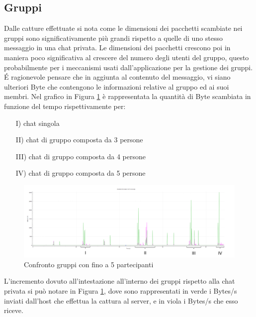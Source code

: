 \documentclass{article}
\begin{document}
\subsection{Gruppi}


Dalle catture effettuate si nota come le dimensioni dei pacchetti scambiate nei gruppi sono significativamente più grandi 
rispetto a quelle di uno stesso messaggio in una chat privata. Le dimensioni dei pacchetti crescono poi in maniera poco 
significativa al crescere del numero degli utenti del gruppo, questo probabilmente per i meccanismi usati dall'applicazione per 
la gestione dei gruppi. \'E ragionevole pensare che in aggiunta al contenuto del messaggio, vi siano ulteriori Byte che contengono 
le informazioni relative al gruppo ed ai suoi membri. Nel grafico in Figura \ref{grup5} è rappresentata la quantità di Byte scambiata in 
funzione del tempo rispettivamente per:
\begin{itemize}
  \item[I)] chat singola
  \item[II)] chat di gruppo composta da 3 persone
  \item[III)] chat di gruppo composta da 4 persone
  \item[IV)] chat di gruppo composta da 5 persone
\end{itemize}

\begin{figure}[h]
  \centering
  \includegraphics[width=1\textwidth]{5gruppi.png}
  \caption{Confronto gruppi con fino a 5 partecipanti}\label{grup5}
  \end{figure}

L'incremento dovuto all'intestazione all'interno dei gruppi rispetto alla chat privata si può notare in Figura \ref{grup5}, 
dove sono rappresentati in verde i Bytes/s inviati dall'host che effettua la cattura al server, e in viola i Bytes/s che esso riceve.
\end{document}

